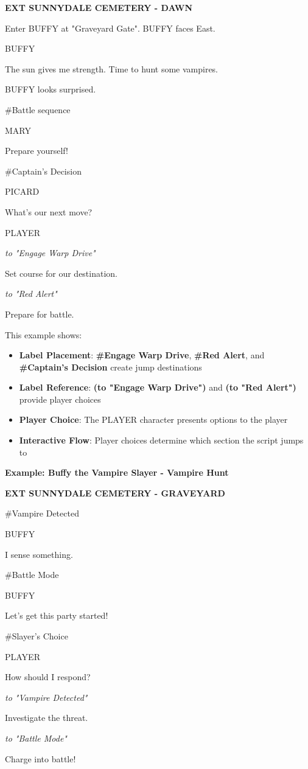 \documentclass[11pt,letterpaper,oldstylefigures]{memoir}
\newcommand{\slugline}[1]{\nobreak\textbf{\MakeUppercase{#1}}\par\nobreak\vspace{1\baselineskip}}
\newcommand{\speaker}[1]{\nobreak\hspace*{0.333\textwidth}\MakeUppercase{#1}\par\nobreak\vspace{0.5\baselineskip}}
\newcommand{\dialogue}[1]{\nobreak\hspace*{0.25\textwidth}\begin{minipage}{0.5\textwidth}#1\end{minipage}\par\vspace{1\baselineskip}}
\newcommand{\parenthetical}[1]{\nobreak\vspace{0.5\baselineskip}\hspace*{0.292\textwidth}\begin{minipage}{0.416\textwidth}\textit{#1}\end{minipage}\par\vspace{0.5\baselineskip}}
\newcommand{\stagedir}[1]{#1\par\vspace{1\baselineskip}}
\newenvironment{FountainExample}
  {\begingroup
  \ttfamily\small
   \setlength{\parindent}{0pt}
  \setlength{\parskip}{0.5em}
  \allowdisplaybreaks
  \setlength{\displaywidowpenalty}{0}
  \setlength{\widowpenalty}{0}
  \setlength{\clubpenalty}{0}
  \setlength{\interlinepenalty}{0}
}
  {\endgroup}
\newcommand{\fountain}[1]{\textbf{#1}}
\begin{document}
\begin{FountainExample}
\slugline{EXT SUNNYDALE CEMETERY - DAWN}

\stagedir{Enter BUFFY at "Graveyard Gate". BUFFY faces East.}
\speaker{BUFFY}
\dialogue{The sun gives me strength. Time to hunt some vampires.}

\stagedir{BUFFY looks surprised.}
\end{FountainExample}

\begin{FountainExample}

\stagedir{\#Battle sequence}

\speaker{MARY}
\dialogue{Prepare yourself!}
\stagedir{\#Captain's Decision}
\speaker{PICARD}
\dialogue{What's our next move?}
\speaker{PLAYER}
\parenthetical{to "Engage Warp Drive"}
\dialogue{Set course for our destination.}

\parenthetical{to "Red Alert"}
\dialogue{Prepare for battle.}
\end{FountainExample}

This example shows:
\begin{itemize}
\item \textbf{Label Placement}: \fountain{\#Engage Warp Drive}, \fountain{\#Red Alert}, and \fountain{\#Captain's Decision} create jump destinations
\item \textbf{Label Reference}: \fountain{(to "Engage Warp Drive")} and \fountain{(to "Red Alert")} provide player choices
\item \textbf{Player Choice}: The PLAYER character presents options to the player
\item \textbf{Interactive Flow}: Player choices determine which section the script jumps to
\end{itemize}

\textbf{Example: Buffy the Vampire Slayer - Vampire Hunt}

\begin{FountainExample}
\slugline{EXT SUNNYDALE CEMETERY - GRAVEYARD}


\stagedir{\#Vampire Detected}

\speaker{BUFFY}
\dialogue{I sense something.}

\stagedir{\#Battle Mode}

\speaker{BUFFY}
\dialogue{Let's get this party started!}

\stagedir{\#Slayer's Choice}
\speaker{PLAYER}
\dialogue{How should I respond?}
\parenthetical{to "Vampire Detected"}
\dialogue{Investigate the threat.}

\parenthetical{to "Battle Mode"}
\dialogue{Charge into battle!}
\end{FountainExample}
\end{document}
